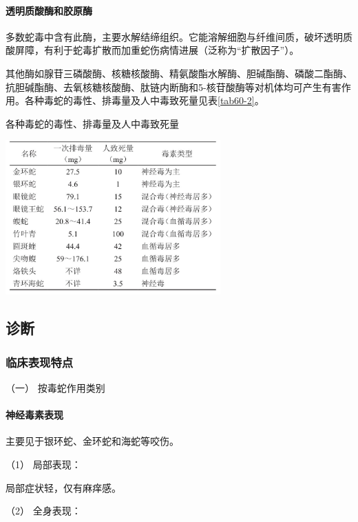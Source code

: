 \paragraph{透明质酸酶和胶原酶}

多数蛇毒中含有此酶，主要水解结缔组织。它能溶解细胞与纤维间质，破坏透明质酸屏障，有利于蛇毒扩散而加重蛇伤病情进展（泛称为“扩散因子”）。

其他酶如腺苷三磷酸酶、核糖核酸酶、精氨酸酯水解酶、胆碱酯酶、磷酸二酯酶、抗胆碱酯酶、去氧核糖核酸酶、肽链内断酶和5-核苷酸酶等对机体均可产生有害作用。各种毒蛇的毒性、排毒量及人中毒致死量见表\ref{tab60-2}。

\begin{table}[htbp]
\centering
\caption{各种毒蛇的毒性、排毒量及人中毒致死量}
\label{tab60-2}
\includegraphics[width=3.25in,height=2.33333in]{./images/Image00229.jpg}
\end{table}

\subsection{诊断}

\subsubsection{临床表现特点}

\hypertarget{text00172.htmlux5cux23CHP5-8-1-2-1-1}{}
（一） 按毒蛇作用类别

\paragraph{神经毒素表现}

主要见于银环蛇、金环蛇和海蛇等咬伤。

\hypertarget{text00172.htmlux5cux23CHP5-8-1-2-1-1-1-1}{}
（1） 局部表现：

局部症状轻，仅有麻痒感。

\hypertarget{text00172.htmlux5cux23CHP5-8-1-2-1-1-1-2}{}
（2） 全身表现：


